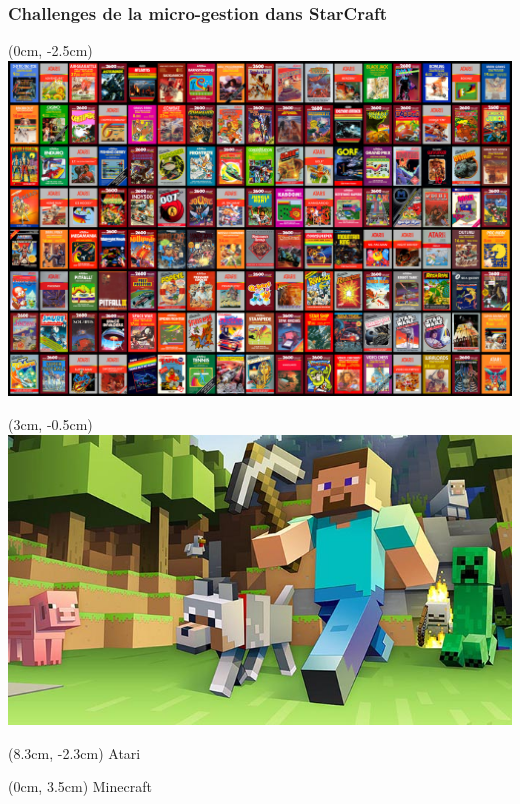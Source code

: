 \documentclass[smaller]{beamer}
\begin{document}

\begin{frame}
  \frametitle{Challenges de la micro-gestion dans StarCraft}

  \begin{textblock*}{8cm}(0cm, -2.5cm)
    \includegraphics[width=\linewidth]{./figs/atari}
  \end{textblock*}

  \begin{textblock*}{8cm}(3cm, -0.5cm)
    \includegraphics[width=\linewidth]{./figs/minecraft}
  \end{textblock*}

  \begin{textblock*}{2cm}(8.3cm, -2.3cm)
    {\huge Atari}
  \end{textblock*}

  \begin{textblock*}{2cm}(0cm, 3.5cm)
    {\huge Minecraft}
  \end{textblock*}
  
\end{frame}
\end{document}
